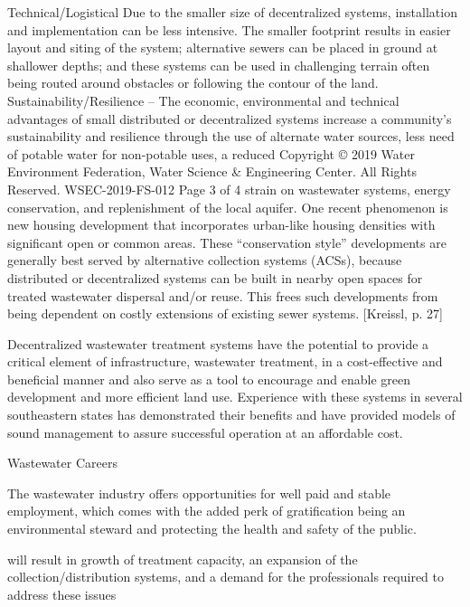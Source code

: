 Technical/Logistical
Due to the smaller size of decentralized systems, installation and implementation can be less intensive. The smaller footprint results in easier layout and siting of the system; alternative sewers can be placed in ground at shallower depths; and these systems can be used in challenging terrain often being routed around obstacles or following the contour of the land.
Sustainability/Resilience – The economic, environmental and technical advantages of small distributed or decentralized systems increase a community’s sustainability and resilience through the use of alternate water sources, less need of potable water for non-potable uses, a reduced Copyright © 2019 Water Environment Federation, Water Science \& Engineering Center.
All Rights Reserved. WSEC-2019-FS-012 Page 3 of 4
strain on wastewater systems, energy conservation, and replenishment of the local aquifer.
One recent phenomenon is new housing development that incorporates urban-like housing densities with significant open or common areas. These “conservation style” developments are generally best served by alternative collection systems (ACSs), because distributed or decentralized systems can be built in nearby open spaces for treated wastewater dispersal and/or reuse. This frees such developments from being dependent on costly extensions of existing sewer systems. [Kreissl, p. 27]

Decentralized
wastewater treatment systems have the potential to provide a critical element of infrastructure,
wastewater treatment, in a cost-effective and beneficial manner and also serve as a tool to
encourage and enable green development and more efficient land use. Experience with these
systems in several southeastern states has demonstrated their benefits and have provided models
of sound management to assure successful operation at an affordable cost.



Wastewater Careers

The wastewater industry offers opportunities for well paid and stable employment, which comes with the added perk of  gratification being an environmental steward and protecting the health and safety of the public.

will result in growth of treatment capacity, an expansion of
the collection/distribution systems, and a demand for the professionals required to address these
issues